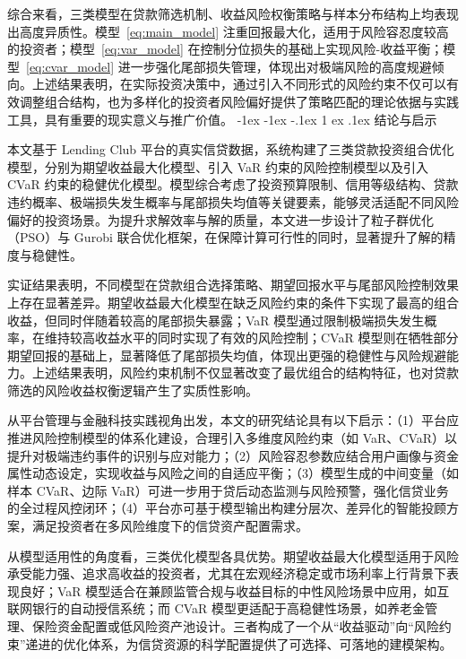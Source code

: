 \documentclass{write_paper}
\makeatletter
\renewcommand\section{\@startsection {section}{1}{\z@}%
                                   {-1ex \@plus -1ex \@minus -.1ex}%
                                   {1 ex \@plus.1ex}%
                                   {\normalfont\large\bfseries}}
\makeatother
\begin{document}
综合来看，三类模型在贷款筛选机制、收益风险权衡策略与样本分布结构上均表现出高度异质性。模型~\ref{eq:main_model} 注重回报最大化，适用于风险容忍度较高的投资者；模型~\ref{eq:var_model} 在控制分位损失的基础上实现风险-收益平衡；模型~\ref{eq:cvar_model} 进一步强化尾部损失管理，体现出对极端风险的高度规避倾向。上述结果表明，在实际投资决策中，通过引入不同形式的风险约束不仅可以有效调整组合结构，也为多样化的投资者风险偏好提供了策略匹配的理论依据与实践工具，具有重要的现实意义与推广价值。
\section{结论与启示}
\label{sec:conclusion}

本文基于 Lending Club 平台的真实信贷数据，系统构建了三类贷款投资组合优化模型，分别为期望收益最大化模型、引入 VaR 约束的风险控制模型以及引入 CVaR 约束的稳健优化模型。模型综合考虑了投资预算限制、信用等级结构、贷款违约概率、极端损失发生概率与尾部损失均值等关键要素，能够灵活适配不同风险偏好的投资场景。为提升求解效率与解的质量，本文进一步设计了粒子群优化（PSO）与 Gurobi 联合优化框架，在保障计算可行性的同时，显著提升了解的精度与稳健性。

实证结果表明，不同模型在贷款组合选择策略、期望回报水平与尾部风险控制效果上存在显著差异。期望收益最大化模型在缺乏风险约束的条件下实现了最高的组合收益，但同时伴随着较高的尾部损失暴露；VaR 模型通过限制极端损失发生概率，在维持较高收益水平的同时实现了有效的风险控制；CVaR 模型则在牺牲部分期望回报的基础上，显著降低了尾部损失均值，体现出更强的稳健性与风险规避能力。上述结果表明，风险约束机制不仅显著改变了最优组合的结构特征，也对贷款筛选的风险收益权衡逻辑产生了实质性影响。

从平台管理与金融科技实践视角出发，本文的研究结论具有以下启示：（1）平台应推进风险控制模型的体系化建设，合理引入多维度风险约束（如 VaR、CVaR）以提升对极端违约事件的识别与应对能力；（2）风险容忍参数应结合用户画像与资金属性动态设定，实现收益与风险之间的自适应平衡；（3）模型生成的中间变量（如样本 CVaR、边际 VaR）可进一步用于贷后动态监测与风险预警，强化信贷业务的全过程风控闭环；（4）平台亦可基于模型输出构建分层次、差异化的智能投顾方案，满足投资者在多风险维度下的信贷资产配置需求。

从模型适用性的角度看，三类优化模型各具优势。期望收益最大化模型适用于风险承受能力强、追求高收益的投资者，尤其在宏观经济稳定或市场利率上行背景下表现良好；VaR 模型适合在兼顾监管合规与收益目标的中性风险场景中应用，如互联网银行的自动授信系统；而 CVaR 模型更适配于高稳健性场景，如养老金管理、保险资金配置或低风险资产池设计。三者构成了一个从“收益驱动”向“风险约束”递进的优化体系，为信贷资源的科学配置提供了可选择、可落地的建模架构。
\end{document}
